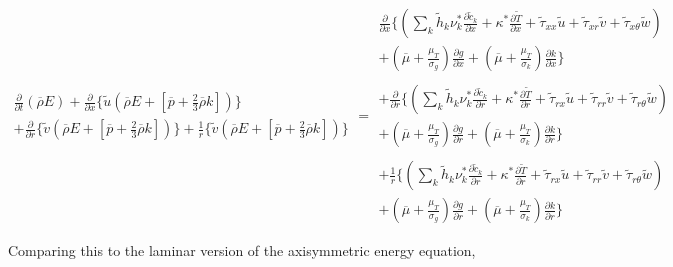 \begin{equation}
	\begin{array}{c}
		\frac{\partial}{\partial t}(\overline{\rho}E) +
		\frac{\partial}{\partial x}\Big\{\tilde u(\overline{\rho}E + [\overline{p} + \frac{2}{3}\overline{\rho}k])\Big\} 
		 \\ +
		\frac{\partial}{\partial r}\Big\{\tilde v(\overline{\rho}E + [\overline{p} + \frac{2}{3}\overline{\rho}k])\Big\} +
		\frac{1}{r}\Big\{\tilde v(\overline{\rho}E + [\overline{p} + \frac{2}{3}\overline{\rho}k])\Big\}
	\end{array} = 
	\begin{array}{c}
		\frac{\partial}{\partial x}\Big\{
		(\sum_{k}\tilde h_k \nu_k^* \frac{\partial \tilde c_k}{\partial x} + \kappa^*\frac{\partial \tilde T}
		{\partial x} + \tilde \tau_{xx} \tilde u + \tilde \tau_{xr} \tilde v + \tilde \tau_{x\theta} \tilde w) 
	 	\\
		+ (\overline{\mu} + \frac{\mu_T}{\sigma_g})\frac{\partial g}{\partial x} 
		+ (\overline{\mu} + \frac{\mu_T}{\sigma_k})\frac{\partial k}{\partial x} \Big\}
		\\ \\ + 
		\frac{\partial}{\partial r}\Big\{
		(\sum_{k}\tilde h_k \nu_k^* \frac{\partial \tilde c_k}{\partial r} + \kappa^*\frac{\partial \tilde T}
		{\partial r} + \tilde \tau_{rx} \tilde u + \tilde \tau_{rr} \tilde v + \tilde \tau_{r\theta} \tilde w) 
	 	\\
		+ (\overline{\mu} + \frac{\mu_T}{\sigma_g})\frac{\partial g}{\partial r}
		+ (\overline{\mu} + \frac{\mu_T}{\sigma_k})\frac{\partial k}{\partial r} \Big\} 
		\\ \\+ 
		\frac{1}{r}\Big\{
		(\sum_{k}\tilde h_k \nu_k^* \frac{\partial \tilde c_k}{\partial r} + \kappa^*\frac{\partial \tilde T}
		{\partial r} + \tilde \tau_{rx} \tilde u + \tilde \tau_{rr} \tilde v + \tilde \tau_{r\theta} \tilde w) 
	 	\\
		+ (\overline{\mu} + \frac{\mu_T}{\sigma_g})\frac{\partial g}{\partial r}
		+ (\overline{\mu} + \frac{\mu_T}{\sigma_k})\frac{\partial k}{\partial r} \Big\} 
	\end{array}
\label{eqn:energyturb}
\end{equation}


	Comparing this to the laminar version of the axisymmetric energy equation,

